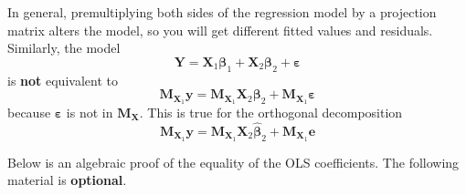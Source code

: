 \documentclass[]{book}
\theoremstyle{definition}
\theoremstyle{definition}
\theoremstyle{definition}
\theoremstyle{remark}
\let\BeginKnitrBlock\begin \let\EndKnitrBlock\end
\begin{document}
\BeginKnitrBlock{rmdcaution}
In general, premultiplying both sides of the regression model by a
projection matrix alters the model, so you will get different fitted
values and residuals. Similarly, the model
\[\boldsymbol{Y} = \mathbf{X}_1 \boldsymbol{\beta}_1 + \mathbf{X}_2\boldsymbol{\beta}_2 + \boldsymbol{\varepsilon}\]
is \textbf{not} equivalent to \[
\mathbf{M}_{\mathbf{X}_1}\boldsymbol{y} = \mathbf{M}_{\mathbf{X}_1}\mathbf{X}_2 \boldsymbol{\beta}_2 + \mathbf{M}_{\mathbf{X}_1}\boldsymbol{\varepsilon}
\] because \(\boldsymbol{\varepsilon}\) is not in
\(\mathbf{M}_\mathbf{X}\). This is true for the orthogonal decomposition
\[
\mathbf{M}_{\mathbf{X}_1}\boldsymbol{y} = \mathbf{M}_{\mathbf{X}_1}\mathbf{X}_2 \hat{\boldsymbol{\beta}}_2 + \mathbf{M}_{\mathbf{X}_1}\boldsymbol{e}
\]
\EndKnitrBlock{rmdcaution}

Below is an algebraic proof of the equality of the OLS coefficients. The
following material is \textbf{optional}.
\end{document}
